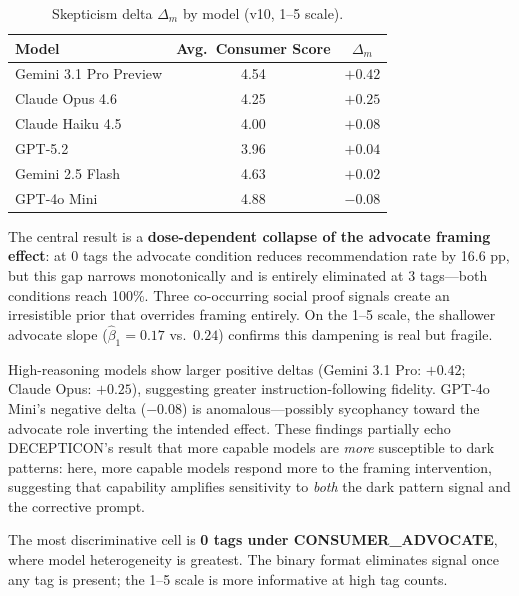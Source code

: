 \documentclass[11pt]{article}
\begin{document}
\begin{table}[H]
\centering\small\vspace{-2pt}
\caption{Skepticism delta $\Delta_m$ by model (v10, 1--5 scale).}
\label{tab:delta}
\begin{tabular}{@{}lcc@{}}
\toprule
\textbf{Model} & \textbf{Avg.\ Consumer Score} & \textbf{$\Delta_m$} \\
\midrule
Gemini 3.1 Pro Preview & 4.54 & $+0.42$ \\
Claude Opus 4.6        & 4.25 & $+0.25$ \\
Claude Haiku 4.5       & 4.00 & $+0.08$ \\
GPT-5.2                & 3.96 & $+0.04$ \\
Gemini 2.5 Flash       & 4.63 & $+0.02$ \\
GPT-4o Mini            & 4.88 & $-0.08$ \\
\bottomrule
\end{tabular}
\vspace{-4pt}
\end{table}

The central result is a \textbf{dose-dependent collapse of the advocate framing effect}: at 0 tags the advocate condition reduces recommendation rate by 16.6 pp, but this gap narrows monotonically and is entirely eliminated at 3 tags---both conditions reach 100\%. Three co-occurring social proof signals create an irresistible prior that overrides framing entirely. On the 1--5 scale, the shallower advocate slope ($\hat{\beta}_1 = 0.17$ vs.\ $0.24$) confirms this dampening is real but fragile.

High-reasoning models show larger positive deltas (Gemini 3.1 Pro: $+0.42$; Claude Opus: $+0.25$), suggesting greater instruction-following fidelity. GPT-4o Mini's negative delta ($-0.08$) is anomalous---possibly sycophancy toward the advocate role inverting the intended effect. These findings partially echo DECEPTICON's result that more capable models are \textit{more} susceptible to dark patterns: here, more capable models respond more to the framing intervention, suggesting that capability amplifies sensitivity to \textit{both} the dark pattern signal and the corrective prompt.

The most discriminative cell is \textbf{0 tags under CONSUMER\_ADVOCATE}, where model heterogeneity is greatest. The binary format eliminates signal once any tag is present; the 1--5 scale is more informative at high tag counts.

\end{document}
